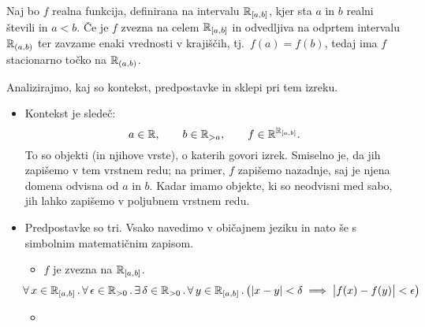         \begin{izrek}[Rolle]
                Naj bo $f$ realna funkcija, definirana na intervalu ${\mathbb{R}}_{[a, b]}$, kjer sta $a$ in $b$ realni števili in $a < b$. Če je $f$ zvezna na celem ${\mathbb{R}}_{[a, b]}$ in odvedljiva na odprtem intervalu ${\mathbb{R}}_{(a, b)}$ ter zavzame enaki vrednosti v krajiščih, tj.~$f(a) = f(b)$, tedaj ima $f$ stacionarno točko na ${\mathbb{R}}_{(a, b)}$.
        \end{izrek}

        Analizirajmo, kaj so kontekst, predpostavke in sklepi pri tem izreku.

        \begin{itemize}
                \item
                        Kontekst je sledeč:
                        \[a \in \mathbb{R}, \qquad b \in \mathbb{R}_{> a}, \qquad f \in \mathbb{R}^{{\mathbb{R}}_{[a, b]}}.\]
                        To so objekti (in njihove vrste), o katerih govori izrek. Smiselno je, da jih zapišemo v tem vrstnem redu; na primer, $f$ zapišemo nazadnje, saj je njena domena odvisna od $a$ in $b$. Kadar imamo objekte, ki so neodvisni med sabo, jih lahko zapišemo v poljubnem vrstnem redu.
                \item
                        Predpostavke so tri. Vsako navedimo v običajnem jeziku in nato še s simbolnim matematičnim zapisom.
                        \begin{itemize}
                                \item
                                        $f$ je zvezna na ${\mathbb{R}}_{[a, b]}$.
                                        \[
                                                \hspace{-2em}
                                                \xall{x}[\intcc{a}{b}]{
                                                        \xall{\epsilon}[\RR_{> 0}]{
                                                                \xsome{\delta}[\RR_{> 0}]{
                                                                        \all{y}[\intcc{a}{b}]{
                                                                                |x - y| < \delta \implies \big|f(x) - f(y)\big| < \epsilon
                                                                        }
                                                                }
                                                        }
                                                }
                                        \]
                                \item

\end{itemize}
\end{itemize}
